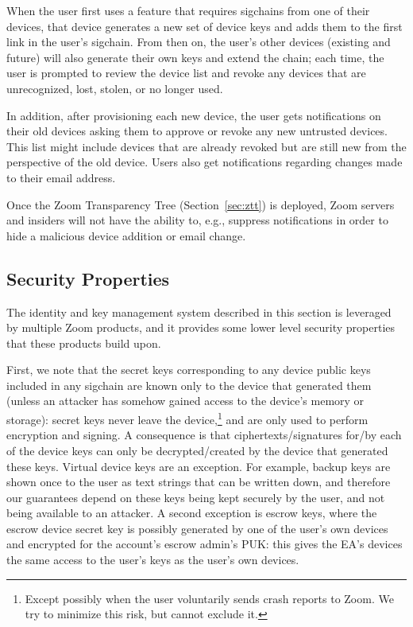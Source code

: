 When the user first uses a feature that requires sigchains from one of their devices, that device
generates a new set of device keys and adds them to the first link in the user's sigchain. From then
on, the user's other devices (existing and future) will also generate their own keys and extend the
chain; each time, the user is prompted to review the device list and revoke any devices that are
unrecognized, lost, stolen, or no longer used.

In addition, after provisioning each new device, the user gets notifications on their old devices
asking them to approve or revoke any new untrusted devices. This list might include devices that are
already revoked but are still new from the perspective of the old device. Users also get
notifications regarding changes made to their email address.

Once the Zoom Transparency Tree (Section~\ref{sec:ztt}) is deployed, Zoom servers and insiders will
not have the ability to, e.g., suppress notifications in order to hide a malicious device addition
or email change.





\subsection{Security Properties}
\label{sec:IdKmProps}

The identity and key management system described in this section is leveraged by multiple Zoom
products, and it provides some lower level security properties that these products build upon.

First, we note that the secret keys corresponding to any device public keys included in any sigchain
are known only to the device that generated them (unless an attacker has somehow gained access to
the device's memory or storage): secret keys never leave the device,\footnote{Except possibly when
the user voluntarily sends crash reports to Zoom. We try to minimize this risk, but cannot exclude
it.} and are only used to perform encryption and signing. A consequence is that
ciphertexts/signatures for/by each of the device keys can only be decrypted/created by the device
that generated these keys. Virtual device keys are an exception. For example, backup keys are shown
once to the user as text strings that can be written down, and therefore our guarantees depend on
these keys being kept securely by the user, and not being available to an attacker. A second
exception is escrow keys, where the escrow device secret key is possibly generated by one of the
user's own devices and encrypted for the account's escrow admin's PUK: this gives the EA's devices
the same access to the user's keys as the user's own devices.

